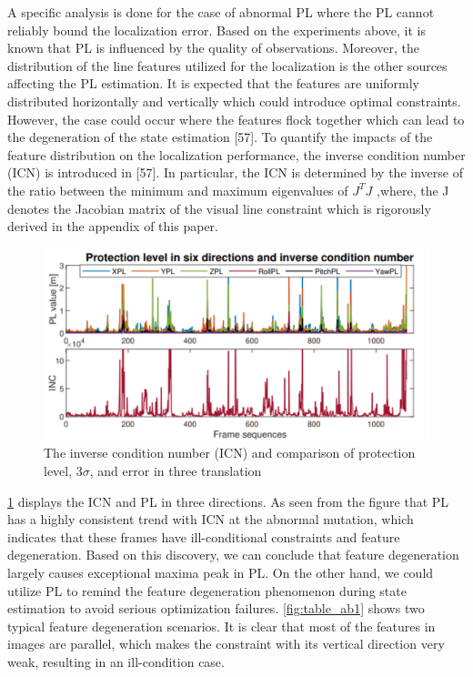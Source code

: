 \documentclass[10pt, letterpaper]{article}
\begin{document}
\begin{multicols*}{2}
A specific analysis is done for the case of abnormal PL where
the PL cannot reliably bound the localization error. Based on
the experiments above, it is known that PL is influenced by the
quality of observations. Moreover, the distribution of the line features utilized for the localization is the other sources
affecting the PL estimation. It is expected that the features are
uniformly distributed horizontally and vertically which could
introduce optimal constraints. However, the case could occur
where the features flock together which can lead to the
degeneration of the state estimation [57]. To quantify the
impacts of the feature distribution on the localization
performance, the inverse condition number (ICN) is introduced
in [57]. In particular, the ICN is determined by the inverse of
the ratio between the minimum and maximum eigenvalues of
$J^T J$ ,where, the J denotes the Jacobian matrix of the visual line
constraint which is rigorously derived in the appendix of this
paper.
\begin{figure}[H]
    \centering
    \includegraphics[width=\columnwidth]{images/frame_se2.png}
    \caption{The inverse condition number (ICN) and comparison of protection level, 3$\sigma$, and error in three translation }
    \label{fig:Frame_sequence2}
\end{figure}
\cref{fig:Frame_sequence2} displays the ICN and PL in three directions. As seen
from the figure that PL has a highly consistent trend with ICN
at the abnormal mutation, which indicates that these frames
have ill-conditional constraints and feature degeneration. Based
on this discovery, we can conclude that feature degeneration
largely causes exceptional maxima peak in PL. On the other
hand, we could utilize PL to remind the feature degeneration
phenomenon during state estimation to avoid serious
optimization failures. \cref{fig:table_ab1} shows two typical feature
degeneration scenarios. It is clear that most of the features in
images are parallel, which makes the constraint with its vertical
direction very weak, resulting in an ill-condition case.


\end{multicols*}
\end{document}
